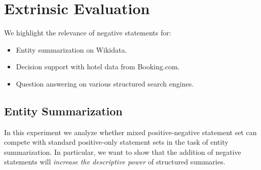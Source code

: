 \section{Extrinsic Evaluation}
\label{sec:extrinsicevaluation}
We highlight the relevance of negative statements for:
\begin{itemize}
    \item Entity summarization on Wikidata.
    \item Decision support with hotel data from Booking.com.
    \item Question answering on various structured search engines.
\end{itemize}

\subsection{Entity Summarization}
In this experiment we analyze whether mixed positive-negative statement set can compete with standard positive-only statement sets in the task of entity summarization. In particular, we want to show that the addition of negative statements will \textit{increase the descriptive power} of structured summaries.

